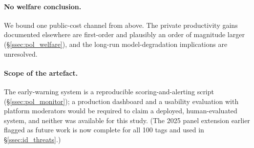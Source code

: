 \paragraph{No welfare conclusion.}\label{ssec:lim_welfare}
We bound one public-cost channel from above. The private
productivity gains documented elsewhere are first-order and
plausibly an order of magnitude larger
(\S\ref{ssec:pol_welfare}), and the long-run model-degradation
implications \citep{shumailov2024curse} are unresolved.

\paragraph{Scope of the artefact.}\label{ssec:lim_artefact}
The early-warning system is a reproducible scoring-and-alerting
script (\S\ref{ssec:pol_monitor}); a production dashboard and a
usability evaluation with platform moderators would be required
to claim a deployed, human-evaluated system, and neither was
available for this study. (The 2025 panel extension earlier
flagged as future work is now complete for all 100 tags and used
in \S\ref{ssec:id_threats}.)
